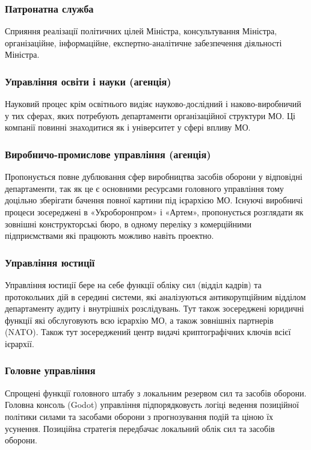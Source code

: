 \subsubsection{Патронатна служба}

Сприяння реалізації політичних цілей Міністра, консультування Міністра, організаційне, інформаційне, експертно-аналітичне забезпечення діяльності Міністра.

\subsubsection{Управління освіти і науки (агенція)}

Науковий процес крім освітнього видіяє науково-дослідний і наково-виробничий у тих сферах, яких потребують департаменти організаційної структури МО. Ці компанії повинні знаходитися як і університет у сфері впливу МО.

\subsubsection{Виробничо-промислове управління (агенція)}

Пропонується повне дублювання сфер виробництва засобів оборони у відповідні департаменти, так як це є основними ресурсами головного управління тому доцільно зберігати бачення повної картини під ієрархією МО. Існуючі виробничі процеси зосереджені в «Укроборонпром» і «Артем», пропонується розглядати як зовнішні конструкторські бюро, в одному переліку з комерційними підприємствами які працюють можливо навіть проектно.

\subsubsection{Управління юстиції}

Управління юстиції бере на себе функції обліку сил (відділ кадрів) та протокольних дій в середині системи, які аналізуються антикорупційним відділом департаменту аудиту і внутрішніх розслідувань. Тут також зосереджені юридичні функції які обслуговують всю ієрархію МО, а також зовнішніх партнерів (NATO). Також тут зосереджений центр видачі криптографічних ключів всієї ієрархії.

\subsubsection{Головне управління}

Спрощені функції головного штабу з локальним резервом сил та засобів оборони. Головна консоль (Godot) управління підпорядковуєть логіці ведення позиційної політики силами та засобами оборони з прогнозування подій та ціною їх усунення. Позиційна стратегія передбачає локальний облік сил та засобів оборони.

